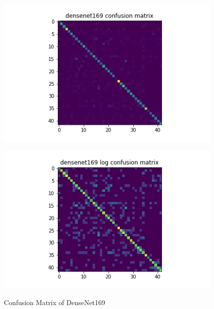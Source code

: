 \begin{figure}[H]
\begin{minipage}[b]{.5\linewidth}
    {\includegraphics[width=1.2\textwidth]{figs/conf_matrix/densenet169_conf.png}}
  \end{minipage}
  \hfill
  \begin{minipage}[b]{.5\linewidth}
    \centering

    {\includegraphics[width=1.2\textwidth]{figs/conf_matrix/densenet169_log_conf.png}}
  \end{minipage}

  \caption{Confusion Matrix of DenseNet169}
  \label{fig:densenet169_conf}
  \vspace{0.2in}
\end{figure}

